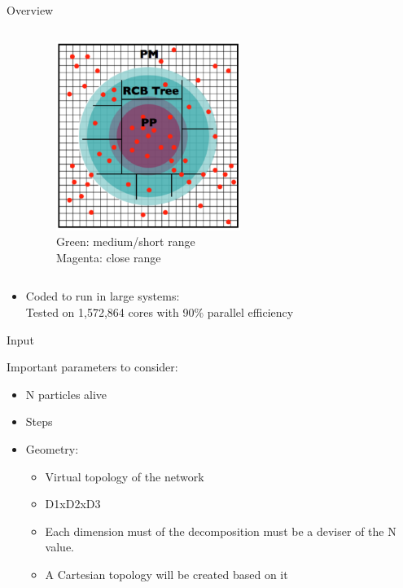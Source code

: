 \documentclass[aspectratio=169]{bredelebeamer}
\begin{document}
\begin{frame}{Overview}
\begin{columns}
\begin{itemize}
\end{itemize}
\begin{figure}[h!]
  \centering
\includegraphics[width=0.65\textwidth, keepaspectratio=1]{"./img/introduction/hacc_force_evaluation"}
\caption*{Green: medium/short range\\Magenta: close range}
\end{figure}

\end{columns}

\begin{itemize}


\item Coded to run in large systems: \\
 Tested on 1,572,864 cores with 90\% parallel efficiency
\end{itemize}
\end{frame}


\begin{frame}{Input}

Important parameters to consider:

\begin{itemize}
\item N particles alive
\item Steps
\item Geometry:
	\begin{itemize}
		\item Virtual topology of the network
		\item D1xD2xD3
		\item Each dimension must of the decomposition must be a deviser of the N value.
		\item A Cartesian topology will be created based on it
	\end{itemize}
\end{itemize}        

\end{frame}
\end{document}
